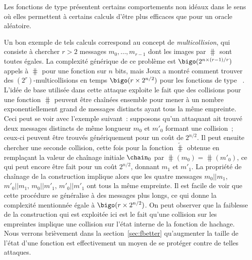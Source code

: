 Les fonctions de type \merkdam présentent certains comportements non idéaux dans le sens où elles permettent à certains calculs
d'être plus efficaces que pour un oracle aléatoire.

Un bon exemple de tels calculs correspond au concept de
\emph{multicollision}, qui consiste à chercher $r > 2$ messages $m_{0},\ldots,m_{r-1}$ dont les images par $\hash$
sont toutes égales.
La complexité générique de ce problème est
$\bigo(2^{n\times (r-1)/r})$ appels à $\hash$ pour une fonction sur $n$ bits, mais
Joux a montré comment trouver
des $(2^r)$-multicollisions en temps $\bigo(r\times 2^{n/2})$ pour les fonctions de type \merkdam~\cite{DBLP:conf/crypto/Joux04}.
L'idée de base utilisée dans cette attaque exploite le fait que des collisions pour une fonction \merkdam $\hash$ peuvent être chaînées
ensemble pour mener à un nombre exponentiellement grand de messages distincts ayant tous la même empreinte.
Ceci peut se voir avec l'exemple suivant~: supposons qu'un attaquant ait trouvé deux messages distincts
de même longueur $m_0$ et $m'_0$ formant une collision~; ceux-ci peuvent être trouvés génériquement
pour un coût de
$2^{n/2}$. Il peut ensuite chercher une seconde collision, cette fois pour la fonction $\widetilde \hash$ obtenue en remplaçant la valeur de chaînage initiale
$\chain_0$ par $\hash(m_0) = \hash(m'_0)$, ce qui peut encore être fait pour un coût $2^{n/2}$, donnant $m_1$ et $m'_1$.
La propriété de chaînage de la construction \merkdam implique alors que les quatre messages
$m_0||m_1$, $m'_0||m_1$, $m_0||m'_1$, $m'_0||m'_1$ ont tous la même empreinte.
Il est facile de voir que cette procédure se généralise à des messages plus longs, ce qui donne la complexité mentionnée égale à
$\bigo(r \times 2^{n/2})$.
On peut observer que la faiblesse de la construction qui est exploitée ici est le fait qu'une collision
sur les empreintes implique une collision sur l'état interne de la fonction de hachage.
Nous verrons brièvement dans la section~\ref{sec:fbetter} qu'augmenter la taille de l'état d'une fonction
est effectivement un moyen de se protéger contre de telles attaques.

